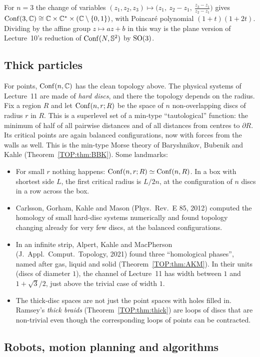For $n=3$ the change of variables $(z_1,z_2,z_3)\mapsto\big(z_1,\ z_2-z_1,\ \frac{z_3-z_1}{z_2-z_1}\big)$
gives $\operatorname{Conf}(3,\mathbb{C})\cong\mathbb{C}\times\mathbb{C}^*\times(\mathbb{C}\setminus\{0,1\})$, with Poincar\'e polynomial $(1+t)(1+2t)$.
Dividing by the affine group $z\mapsto az+b$ in this way is the plane version of Lecture~10's
reduction of $\operatorname{Conf}(N,\mathbb{S}^2)$ by $\mathrm{SO}(3)$.

\subsection{Thick particles}

For points, $\operatorname{Conf}(n,\mathbb{C})$ has the clean topology above. The physical systems of Lecture~11 are made of
\emph{hard discs}, and there the topology depends on the radius. Fix a region $R$ and let
$\operatorname{Conf}(n,r;R)$ be the space of $n$ non-overlapping discs of radius $r$ in $R$. This is a superlevel
set of a min-type ``tautological'' function: the minimum of half of all pairwise distances and of all
distances from centres to $\partial R$. Its critical points are again balanced configurations, now with
forces from the walls as well. This is the min-type Morse theory of Baryshnikov, Bubenik and Kahle
(Theorem~\ref{TOP:thm:BBK}). Some landmarks:
\begin{itemize}
\item For small $r$ nothing happens: $\operatorname{Conf}(n,r;R)\simeq\operatorname{Conf}(n,R)$. In a box with shortest side $L$, the
  first critical radius is $L/2n$, at the configuration of $n$ discs in a row across the box.
\item Carlsson, Gorham, Kahle and Mason (Phys.\ Rev.\ E 85, 2012) computed the homology of small hard-disc systems
  numerically and found topology changing already for very few discs, at the balanced configurations.
\item In an infinite strip, Alpert, Kahle and MacPherson (J.\ Appl.\ Comput.\ Topology,
  2021) found three ``homological phases'', named after gas, liquid and solid
  (Theorem~\ref{TOP:thm:AKM}). In their units (discs of diameter $1$), the channel of Lecture~11 has width
between $1$ and $1+\sqrt3/2$, just above the trivial case of width $1$.
\item The thick-disc spaces are not just the point spaces with holes filled in.
  Ramsey's \emph{thick braids} (Theorem~\ref{TOP:thm:thick}) are loops of discs that are non-trivial even
  though the corresponding loops of points can be contracted.
\end{itemize}

\subsection{Robots, motion planning and algorithms}

